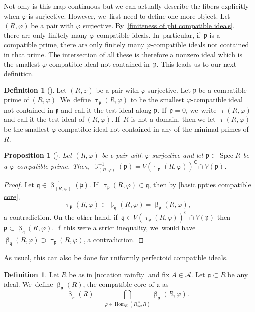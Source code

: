 \documentclass[JEP,XML,SOM,Unicode,published]{cedram}
\let\autoref\cref
\theoremstyle{plain}
\newtheorem{proposition}[theorem]{Proposition}
\theoremstyle{definition}
\newtheorem{definition}[theorem]{Definition}
\numberwithin{equation}{theorem}
\newcommand{\fra}{\mathfrak{a}}
\newcommand{\p}{\mathfrak{p}}
\newcommand{\q}{\mathfrak{q}}
\DeclareMathOperator{\Hom}{Hom}
\DeclareMathOperator{\Spec}{{Spec}}
\newcommand{\sA}{\mathcal{A}}
\renewcommand{\phi}{\varphi}
\newcommand{\rphi}{(R,\phi)}
\newcommand{\inv}{^{-1}}
\newcommand{\rafty}{R^A_\infty}
\begin{document}
Not only is this map continuous but we can actually describe the fibers explicitly when $\phi$ is surjective. However, we~first need to define one more object.
Let $\rphi$ be a pair with $\phi$ surjective. By~\autoref{finiteness of phi compatible ideals}, there are only finitely many $\phi$-compatible ideals. In~particular, if~$\p$ is a compatible prime, there are only finitely many $\phi$-compatible ideals not contained in that prime. The intersection of all these is therefore a nonzero ideal which is the smallest $\phi$-compatible ideal not contained in~$\p$. This leads us to our next definition.

\begin{definition}[{\cf \cite{TakagiHigherDimensionalAdjoint, SmolkinSubadditivity}}]
Let $\rphi$ be a pair with $\phi$ surjective. Let $\p$ be a compatible prime of $\rphi$. We~define $\uptau_\p\rphi$ to be the smallest $\phi$-compatible ideal not contained in $\p$ and call it the test ideal along $\p$. If~$\p=0$, we~write $\uptau\rphi$ and call it the test ideal of $\rphi$. If~$R$ is not a domain, then we let $\uptau\rphi$ be the smallest $\phi$-compatible ideal not contained in any of the minimal primes of $R$.
\end{definition}

\begin{proposition}[{\cf \cite[Prop.\,4.20]{CarvajalFayolleTameRamificationCFPS}}]\label{beta is locally closed}
Let $\rphi$ be a pair with $\phi$ surjective and let $\p\in \Spec R$ be a $\phi$-compatible prime. Then, $\upbeta\inv_{\rphi}(\p)=V(\uptau_\p\rphi)^\mathsf{C}\cap V(\p)$.
\end{proposition}

\begin{proof}
Let $\q\in \upbeta\inv_{\rphi}(\p)$. If~$\uptau_\p\rphi\subset \q$, then by \autoref{basic ppties compatible core},
\[\uptau_\p\rphi\subset \upbeta_\q\rphi=\upbeta_\p\rphi,\]
a contradiction. On the other hand, if~$\q\in V(\uptau_\p\rphi)^\mathsf{C} \cap V(\p)$ then $\p\subset \upbeta_\q\rphi$. If~this were a strict inequality, we~would have $\upbeta_\q\rphi\supset \uptau_\p\rphi$, a contradiction.
\end{proof}

As usual, this can also be done for uniformly perfectoid compatible ideals.

\begin{definition}
Let $R$ be as in \autoref{notation rainfty} and fix $A\in \sA$. Let $\fra\subset R$ be any ideal. We~define $\upbeta_\fra(R)$, the compatible core of $\fra$ as
\[
\upbeta_\fra(R)=\bigcap_{\phi\in \Hom_R\left(\rafty,R\right)}
\upbeta_\fra\rphi.
\]
\end{definition}
\end{document}
